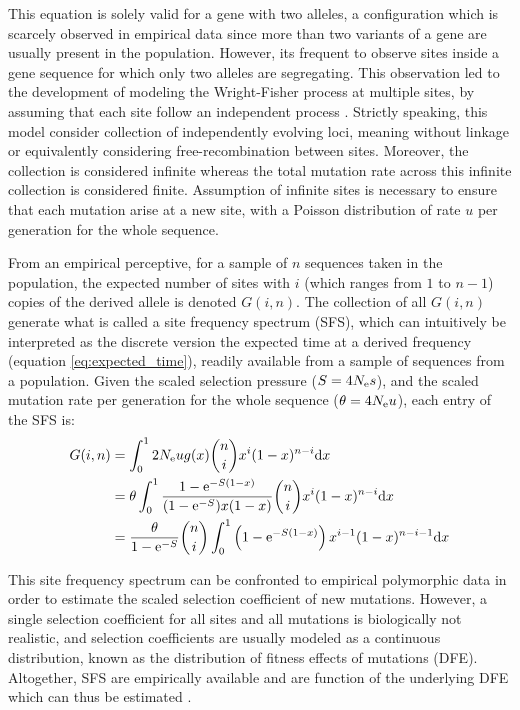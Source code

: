 This equation is solely valid for a gene with two alleles, a configuration which is scarcely observed in empirical data since more than two variants of a gene are usually present in the population.
However, its frequent to observe sites inside a gene sequence for which only two alleles are segregating.
This observation led to the development of modeling the Wright-Fisher process at multiple sites, by assuming that each site follow an independent process \citep{Sawyer1992}.
Strictly speaking, this model consider collection of independently evolving loci, meaning without linkage or equivalently considering free-recombination between sites.
Moreover, the collection is considered infinite whereas the total mutation rate across this infinite collection is considered finite.
Assumption of infinite sites is necessary to ensure that each mutation arise at a new site, with a Poisson distribution of rate $u$ per generation for the whole sequence.

From an empirical perceptive, for a sample of $n$ sequences taken in the population, the expected number of sites with $i$ (which ranges from $1$ to $n-1$) copies of the derived \gls{allele} is denoted $G(i, n)$. 
The collection of all $G(i, n)$ generate what is called a site frequency spectrum (\acrshort{SFS}), which can intuitively be interpreted as the discrete version the expected time at a derived frequency (equation \ref{eq:expected_time}), readily available from a sample of sequences from a population.
Given the scaled selection pressure ($S=4 N_{\textrm{e}} s$), and the scaled mutation rate per generation for the whole sequence ($\theta = 4 N_{\textrm{e}} u $), each entry of the \acrshort{SFS} is:
\begin{align}
	G(i, n) & = \int_{0}^{1}  2 N_{\textrm{e}} u g(x) \binom{n}{i} x^{i} (1-x)^{n-i} \mathrm{d} x \\
	& = \theta \int_{0}^{1} \dfrac{1 - \mathrm{e}^{-S(1-x)}}{(1 - \mathrm{e}^{-S})x(1-x)} \binom{n}{i} x^{i} (1-x)^{n-i} \mathrm{d} x \\
	& =  \dfrac{\theta }{1 - \mathrm{e}^{-S}} \binom{n}{i} \int_{0}^{1} \left( 1 - \mathrm{e}^{-S(1-x)} \right) x^{i-1} (1-x)^{n-i-1} \mathrm{d} x 
\end{align}

This site frequency spectrum can be confronted to empirical polymorphic data in order to estimate the scaled selection coefficient of new mutations.
However, a single selection coefficient for all sites and all mutations is biologically not realistic, and selection coefficients are usually modeled as a continuous distribution, known as the distribution of fitness effects of mutations (\acrshort{DFE}).
Altogether, \acrshort{SFS} are empirically available and are function of the underlying \acrshort{DFE} which can thus be estimated \citep{eyre-walker_distribution_2006, eyre-walker_estimating_2009}. 

